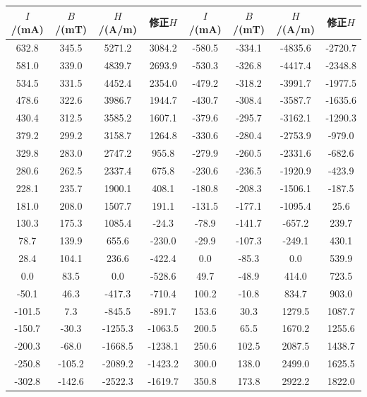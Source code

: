 \documentclass[11pt]{article}
\begin{document}
\begin{table}[H]
    \centering
    \begin{tabular}{|c|c|c|c|c|c|c|c|}\hline
        $I$/(mA)&$B$/(mT)&$H$/(A/m)&修正$H$&$I$/(mA)&$B$/(mT)&$H$/(A/m)&修正$H$\\\hline
        632.8 &345.5  &5271.2 &3084.2  & -580.5&-334.1 &-4835.6&-2720.7\\\hline
        581.0 &339.0  &4839.7 &2693.9  & -530.3&-326.8 &-4417.4&-2348.8\\\hline
        534.5 &331.5  &4452.4 &2354.0  & -479.2&-318.2 &-3991.7&-1977.5\\\hline
        478.6 &322.6  &3986.7 &1944.7  & -430.7&-308.4 &-3587.7&-1635.6\\\hline
        430.4 &312.5  &3585.2 &1607.1  & -379.6&-295.7 &-3162.1&-1290.3\\\hline
        379.2 &299.2  &3158.7 &1264.8  & -330.6&-280.4 &-2753.9&-979.0 \\\hline
        329.8 &283.0  &2747.2 &955.8   & -279.9&-260.5 &-2331.6&-682.6 \\\hline
        280.6 &262.5  &2337.4 &675.8   & -230.6&-236.5 &-1920.9&-423.9 \\\hline
        228.1 &235.7  &1900.1 &408.1   & -180.8&-208.3 &-1506.1&-187.5 \\\hline
        181.0 &208.0  &1507.7 &191.1   & -131.5&-177.1 &-1095.4&25.6   \\\hline
        130.3 &175.3  &1085.4 &-24.3   & -78.9 &-141.7 &-657.2 &239.7  \\\hline
        78.7  &139.9  &655.6  &-230.0  & -29.9 &-107.3 &-249.1 &430.1  \\\hline
        28.4  &104.1  &236.6  &-422.4  & 0.0   &-85.3  &0.0    &539.9  \\\hline
        0.0   &83.5   &0.0    &-528.6  & 49.7  &-48.9  &414.0  &723.5  \\\hline
        -50.1 &46.3   &-417.3 &-710.4  & 100.2 &-10.8  &834.7  &903.0  \\\hline
        -101.5&7.3    &-845.5 &-891.7  & 153.6 &30.3   &1279.5 &1087.7 \\\hline
        -150.7&-30.3  &-1255.3&-1063.5 & 200.5 &65.5   &1670.2 &1255.6 \\\hline
        -200.3&-68.0  &-1668.5&-1238.1 & 250.6 &102.5  &2087.5 &1438.7 \\\hline
        -250.8&-105.2 &-2089.2&-1423.2 & 300.0 &138.0  &2499.0 &1625.5 \\\hline
        -302.8&-142.6 &-2522.3&-1619.7 & 350.8 &173.8  &2922.2 &1822.0 \\\hline

\end{tabular}
\end{table}
\end{document}
